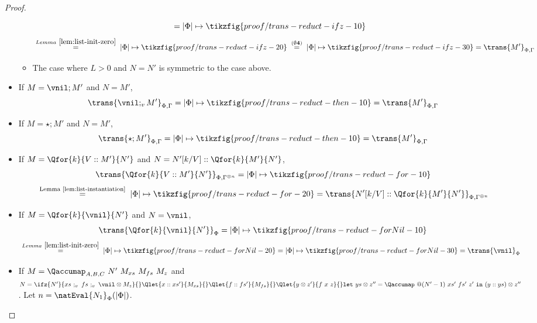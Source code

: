 \begin{proof}
\begin{itemize}
\begin{itemize}
\[                        =
                        |\Phi|\mapsto\tikzfig{proof/trans-reduct-ifz-10}
                    \]
                    \[
                        \;\overset{\scriptstyle{Lemma~\ref{lem:list-init-zero}}}{=}\;
                        |\Phi|\mapsto\tikzfig{proof/trans-reduct-ifz-20}
                        \;\overset{\scriptstyle{\bf{(\emptyset 4)}}}{=}\;
                        |\Phi|\mapsto\tikzfig{proof/trans-reduct-ifz-30}
                        =
                        \trans{M'}_{\Phi,\Gamma}
                    \]
                \item The case where $L>0$ and $N = N'$ is symmetric to the case above.
            \end{itemize}
        \item If $M = \vnil;M'$ and $N=M'$,
            \[
                \trans{\vnil;_v M'}_{\Phi,\Gamma}
                =
                |\Phi|\mapsto\tikzfig{proof/trans-reduct-then-10}
                =
                \trans{M'}_{\Phi,\Gamma}
            \]
        \item If $M = \star;M'$ and $N=M'$,
            \[
                \trans{\star;M'}_{\Phi,\Gamma}
                =
                |\Phi|\mapsto\tikzfig{proof/trans-reduct-then-10}
                =
                \trans{M'}_{\Phi,\Gamma}
            \]
        \item If $M = \Qfor{k}{V :: M'}{N'}$ and $N=N'[k/V]::\Qfor{k}{M'}{N'}$,
            \[
                \trans{\Qfor{k}{V :: M'}{N'}}_{\Phi,\Gamma^{\otimes n}}
                =
                |\Phi|\mapsto\tikzfig{proof/trans-reduct-for-10}
            \]
            \[
                \;\overset{\scriptstyle{\text{Lemma~\ref{lem:list-instantiation}}}}{=}\;
                |\Phi|\mapsto\tikzfig{proof/trans-reduct-for-20}
                =
                \trans{N'[k/V]::\Qfor{k}{M'}{N'}}_{\Phi,\Gamma^{\otimes n}}
            \]
        \item If $M = \Qfor{k}{\vnil}{N'}$ and $N=\vnil$,
            \[
                \trans{\Qfor{k}{\vnil}{N'}}_{\Phi}
                =
                |\Phi|\mapsto\tikzfig{proof/trans-reduct-forNil-10}
            \]
            \[
                \;\overset{\scriptstyle{Lemma~\ref{lem:list-init-zero}}}{=}\;
                |\Phi|\mapsto\tikzfig{proof/trans-reduct-forNil-20}
                =
                |\Phi|\mapsto\tikzfig{proof/trans-reduct-forNil-30}
                =
                \trans{\vnil}_{\Phi}
            \]
        \item If $M = \Qaccumap_{A,B,C}\ N'\ M_{xs}\ M_{fs}\ M_{z}$ and \(N=
                \ifz{N'}{xs\ ;_v\ fs\ ;_v\ \vnil\otimes M_z}{}$\\
                $\Qlet{x :: xs'}{M_{xs}}{} \Qlet{f :: fs'}{M_{fs}}{}
                \Qlet{y\otimes z'}{f\ x\ z}{}
                \mathtt{let\ } ys \otimes z'' = \Qaccumap\ @(N'-1)\ xs'\ fs'\ z'
                \mathtt{\ in\ } (y :: ys) \otimes z''
            \). Let $n = \natEval{N_1}_\Phi(|\Phi|)$.


\end{itemize}
\end{proof}
